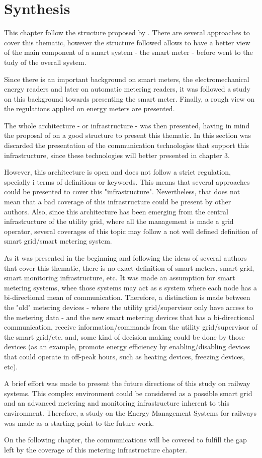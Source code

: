 \section{Synthesis}

This chapter follow the structure proposed by \cite{Siano2014}. There are several approaches to cover this thematic, however the structure followed allows to have a better view of the main component of a smart system - the smart meter - before went to the tudy of the overall system.

Since there is an important background on smart meters, the electromechanical energy readers and later on automatic metering readers, it was followed a study on this background towards presenting the smart meter. Finally, a rough view on the regulations applied on energy meters are presented. 

The whole architecture - or infrastructure - was then presented, having in mind the proposal of \cite{Siano2014} on a good structure to present this thematic. In this section was discarded the presentation of the communication technologies that support this infrastructure, since these technologies will better presented in chapter 3.

However, this architecture is open and does not follow a strict regulation, specially i terms of definitions or keywords. This means that several approaches could be presented to cover this "infrastructure". Nevertheless, that does not mean that a bad coverage of this infrastructure could be present by other authors. Also, since this architecture has been emerging from the central infrastructure of the utility grid, where all the management is made a grid operator, several coverages of this topic may follow a not well defined definition of smart grid/smart metering system.

As it was presented in the beginning and following the ideas of several authors that cover this thematic, there is no exact definition of smart meters, smart grid, smart monitoring infrastructure, etc. It was made an assumption for smart metering systems, whee those systems may act as s system where each node has a bi-directional mean of communication. Therefore, a distinction is made between the "old" metering devices - where the utility grid/supervisor only have access to the metering data - and the new smart metering devices that has a bi-directional communication, receive information/commands from the utility grid/supervisor of the smart grid/etc. and, some kind of decision making could be done by those devices (as an example, promote energy efficiency by enabling/disabling devices that could operate in off-peak hours, such as heating devices, freezing devices, etc).

A brief effort was made to present the future directions of this study on railway systems. This complex environment could be considered as a possible smart grid and an advanced metering and monitoring infrastructure inherent to this environment. Therefore, a study on the Energy Management Systems for railways was made as a starting point to the future work.

On the following chapter, the communications will be covered to fulfill the gap left by the coverage of this metering infrastructure chapter.